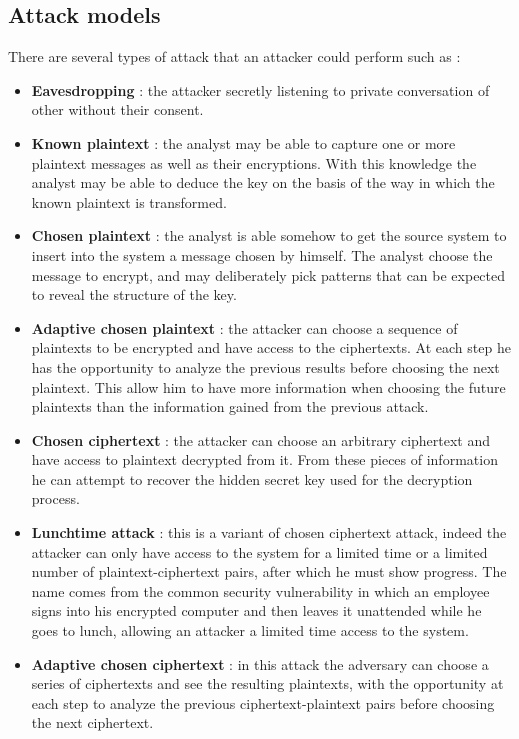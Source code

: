 \documentclass[11pt]{article}
\begin{document}
\subsection{Attack models}
There are several types of attack that an attacker could perform such as :
\begin{itemize}
\item \textbf{Eavesdropping} : the attacker secretly listening to private conversation of other without their consent.
\item \textbf{Known plaintext} : the analyst may be able to capture one or more plaintext messages as well as their encryptions. With this knowledge the analyst may be able to deduce the key on the basis of the way in which the known plaintext is transformed.
\item \textbf{Chosen plaintext} : the analyst is able somehow to get the source system to insert into the system a message chosen by himself. The analyst choose the message to encrypt, and may deliberately pick patterns that can be expected to reveal the structure of the key.
\item \textbf{Adaptive chosen plaintext} : the attacker can choose a sequence of plaintexts to be encrypted and have access to the ciphertexts. At each step he has the opportunity to analyze the previous results before choosing the next plaintext. This allow him to have more information when choosing the future plaintexts than the information gained from the previous attack.
\item \textbf{Chosen ciphertext} : the attacker can choose an arbitrary ciphertext and have access to plaintext decrypted from it. From these pieces of information he can attempt to recover the hidden secret key used for the decryption process.
\item \textbf{Lunchtime attack} : this is a variant of chosen ciphertext attack, indeed the attacker can only have access to the system for a limited time or a limited number of plaintext-ciphertext pairs, after which he must show progress. The name comes from the common security vulnerability in which an employee signs into his encrypted computer and then leaves it unattended while he goes to lunch, allowing an attacker a limited time access to the system.
\item \textbf{Adaptive chosen ciphertext} : in this attack the adversary can choose a series of ciphertexts and see the resulting plaintexts, with the opportunity at each step to analyze the previous ciphertext-plaintext pairs before choosing the next ciphertext.
\end{itemize}
\end{document}
